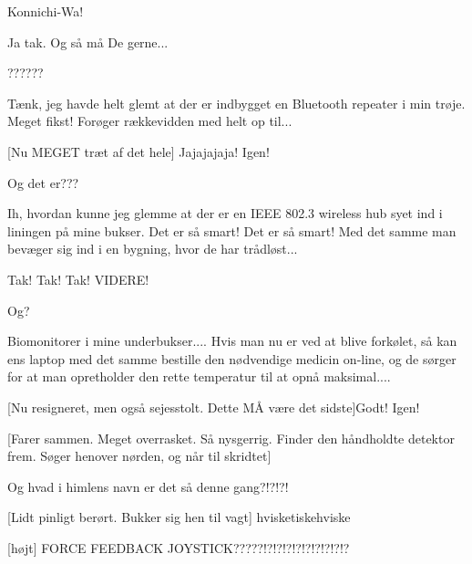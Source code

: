 \documentclass[a4paper,12pt]{article}
\begin{document}
\begin{sketch}
 Konnichi-Wa!

 Ja tak. Og så må De gerne...


 ??????

 Tænk, jeg havde helt glemt at der er indbygget en Bluetooth
repeater i min trøje. Meget fikst! Forøger rækkevidden med helt op
til...

[Nu MEGET træt af det hele] Jajajajaja! Igen!  


 Og det er???

 Ih, hvordan kunne jeg glemme at der er en IEEE 802.3
wireless hub syet ind i liningen på mine bukser. Det er så smart! Det
er så smart! Med det samme man bevæger sig ind i en bygning, hvor de
har trådløst...

 Tak! Tak! Tak! VIDERE!



 Og?

 Biomonitorer i mine underbukser.... Hvis man nu er ved at
blive forkølet, så kan ens laptop med det samme bestille den
nødvendige medicin on-line, og de sørger for at man opretholder den
rette temperatur til at opnå maksimal....

[Nu resigneret, men også sejesstolt. Dette MÅ være det
sidste]Godt! Igen!



[Farer sammen. Meget overrasket. Så nysgerrig. Finder den
håndholdte detektor frem. Søger henover nørden, og når til skridtet]


 Og hvad i himlens navn er det så denne gang?!?!?!

[Lidt pinligt berørt. Bukker sig hen til vagt]
hvisketiskehviske

[højt] FORCE FEEDBACK JOYSTICK?????!?!?!?!?!?!?!?!?!?



\end{sketch}
\end{document}
